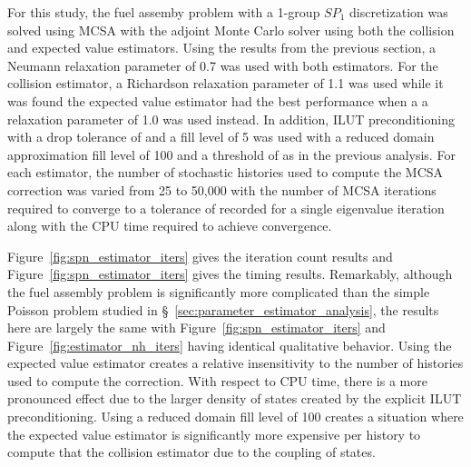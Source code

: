 For this study, the fuel assemby problem with a 1-group $SP_1$
discretization was solved using MCSA with the adjoint Monte Carlo
solver using both the collision and expected value estimators. Using
the results from the previous section, a Neumann relaxation parameter
of 0.7 was used with both estimators. For the collision estimator, a
Richardson relaxation parameter of 1.1 was used while it was found the
expected value estimator had the best performance when a a relaxation
parameter of 1.0 was used instead. In addition, ILUT preconditioning
with a drop tolerance of  and a fill level of 5 was used
with a reduced domain approximation fill level of 100 and a threshold
of  as in the previous analysis. For each estimator, the
number of stochastic histories used to compute the MCSA correction was
varied from 25 to 50,000 with the number of MCSA iterations required
to converge to a tolerance of  recorded for a single
eigenvalue iteration along with the CPU time required to achieve
convergence. 

Figure~\ref{fig:spn_estimator_iters} gives the iteration count results
and Figure~\ref{fig:spn_estimator_iters} gives the timing
results. Remarkably, although the fuel assembly problem is
significantly more complicated than the simple Poisson problem studied
in \S~\ref{sec:parameter_estimator_analysis}, the results here are
largely the same with Figure~\ref{fig:spn_estimator_iters} and
Figure~\ref{fig:estimator_nh_iters} having identical qualitative
behavior. Using the expected value estimator creates a relative
insensitivity to the number of histories used to compute the
correction. With respect to CPU time, there is a more pronounced
effect due to the larger density of states created by the explicit
ILUT preconditioning. Using a reduced domain fill level of 100 creates
a situation where the expected value estimator is significantly more
expensive per history to compute that the collision estimator due to
the coupling of states.

